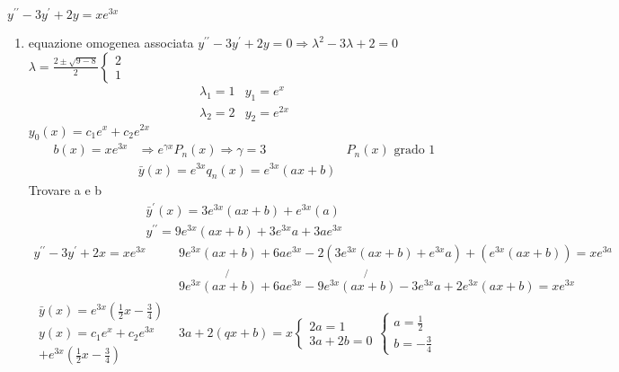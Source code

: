 \begin{esempio}
	$y^{\prime\prime}-3y^\prime+2y=xe^{3x}$
	\begin{enumerate}
		\item equazione omogenea associata
			$y^{\prime\prime}-3y^\prime+2y=0\Rightarrow \lambda^2-3\lambda
			+2=0$ $\lambda=\frac{2\pm\sqrt{9-8}}{2}\begin{cases}
				2\\
				1
			\end{cases}$
			\begin{eqnarray*}
				\lambda_1=1 & y_1=e^x\\
				\lambda_2=2 & y_2=e^{2x}
			\end{eqnarray*}
			$y_0(x)=c_1e^x+c_2e^{2x}$
			\begin{eqnarray*}
				b(x)=xe^{3x} & \Rightarrow e^{\gamma x} P_n(x) \Rightarrow
				\gamma =3 & P_n(x) \text{ grado 1}\\
				& \bar{y}(x)=e^{3x}q_n(x)=e^{3x}(ax+b)
			\end{eqnarray*}
			Trovare a e b
			\begin{eqnarray*}
				\bar{y}^\prime(x)=3e^{3x}(ax+b)+e^{3x}(a)\\
				y^{\prime\prime}=9e^{3x}(ax+b)+3e^{3x}a+3ae^{3x}
			\end{eqnarray*}
			\clearpage
			\begin{eqnarray*}
				y^{\prime\prime}-3y^\prime+2x=xe^{3x} & 9e^{3x}(ax+b)+6ae^{3x}-
				2(3e^{3x}(ax+b)+e^{3x}a)+(e^{3x}(ax+b))=xe^{3a}\\
				&9e^{3x}\not{(ax+b)}+6ae^{3x}-9e^{3x}\not{(ax+b)}-3e^{3x}a+2e^{3x}
				(ax+b)=xe^{3x}\\
				\begin{matrix}
					\bar{y}(x)=e^{3x}\left(\frac{1}{2}x-\frac{3}{4}\right)\\
					y(x)=c_1e^x+c_2e^{3x}\\+e^{3x}\left(\frac{1}{2}x-\frac{3}{4}
					\right)
				\end{matrix} & 3a+2(qx+b)=x \begin{cases}
					2a=1\\
					3a+2b=0
				\end{cases}\begin{cases}
					a=\frac{1}{2}\\
					b=-\frac{3}{4}
				\end{cases}
			\end{eqnarray*}
	\end{enumerate}
\end{esempio}
